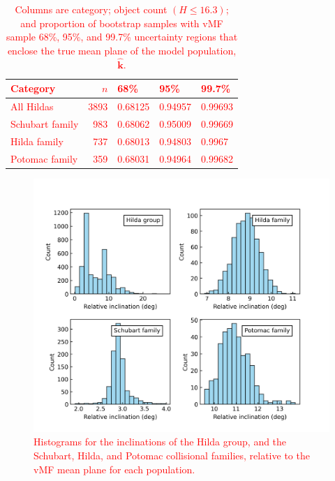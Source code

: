 \documentclass[a4paper,fleqn]{cas-sc}
\begin{document}
\begin{linenumbers}
\begin{table}[h]
    \centering
    \begin{tabular}{lrlll}
         \textcolor{red}{Category} & \textcolor{red}{$n$} & \textcolor{red}{68\%} & \textcolor{red}{95\%} & \textcolor{red}{99.7\%} \\
         \hline
         \textcolor{red}{All Hildas}         & \textcolor{red}{3893} & \textcolor{red}{0.68125} & \textcolor{red}{0.94957} & \textcolor{red}{0.99693} \\
         
         \textcolor{red}{Schubart family}       &  \textcolor{red}{983} & \textcolor{red}{0.68062} &  \textcolor{red}{0.95009} & \textcolor{red}{0.99669} \\
         
         \textcolor{red}{Hilda family}    &  \textcolor{red}{737} & \textcolor{red}{0.68013} &  \textcolor{red}{0.94803} & \textcolor{red}{0.9967} \\
         
         \textcolor{red}{Potomac family}     &  \textcolor{red}{359} & \textcolor{red}{0.68031} &  \textcolor{red}{0.94964} & \textcolor{red}{0.99682} \\
    \end{tabular}
    \caption{\textcolor{red}{Columns are category; object count $(H\leq16.3)$; and proportion of bootstrap samples with vMF sample 68\%, 95\%, and 99.7\% uncertainty regions that enclose the true mean plane of the model population, $\hat{\mathbf{k}}$.}
    }
    \label{t:vmf_demo}
\end{table}

\begin{centering}
\begin{figure}[h]
\includegraphics[width=0.7\columnwidth]{figure1.png}
\caption{
\textcolor{red}{
Histograms for the inclinations of the Hilda group, and the Schubart, Hilda, and Potomac collisional families, relative to the vMF mean plane for each population.
}
}
\label{fig:relative-inclinations}
\end{figure}
\end{centering}


\end{linenumbers}
\end{document}
